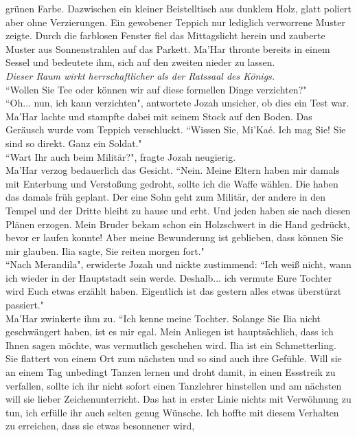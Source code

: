 grünen Farbe. Dazwischen ein kleiner Beistelltisch aus dunklem Holz, glatt poliert aber ohne 
Verzierungen. Ein gewobener Teppich nur lediglich verworrene Muster zeigte. Durch die farblosen 
Fenster fiel das Mittagslicht herein und zauberte Muster aus Sonnenstrahlen auf das Parkett. Ma'Har 
thronte bereits in einem Sessel und bedeutete ihm, sich auf den zweiten nieder zu lassen.\\
\textit{Dieser Raum wirkt herrschaftlicher als der Ratssaal des Königs.}\\
 ``Wollen Sie Tee oder können wir auf diese formellen Dinge verzichten?"\\
 ``Oh... nun, ich kann verzichten", antwortete Jozah unsicher, ob dies ein Test war.\\
Ma'Har lachte und stampfte dabei mit seinem Stock auf den Boden. Das Geräusch wurde vom Teppich 
verschluckt.  ``Wissen Sie, Mi'Kaé. Ich mag Sie! Sie sind so direkt. Ganz ein Soldat."\\
 ``Wart Ihr auch beim Militär?", fragte Jozah neugierig.\\
Ma'Har verzog bedauerlich das Gesicht.  ``Nein. Meine Eltern haben mir damals mit Enterbung und 
Verstoßung gedroht, sollte ich die Waffe wählen. Die haben das damals früh geplant. Der eine Sohn 
geht zum Militär, der andere in den Tempel und der Dritte bleibt zu hause und erbt. Und jeden haben 
sie nach diesen Plänen erzogen. Mein Bruder bekam schon ein Holzschwert in die Hand 
gedrückt, bevor er laufen konnte! Aber meine Bewunderung ist geblieben, dass können Sie mir 
glauben. Ilia sagte, Sie reiten morgen fort."\\
 ``Nach Merandila", erwiderte Jozah und nickte zustimmend:  ``Ich weiß nicht, wann ich wieder in 
der Hauptstadt sein werde. Deshalb... ich vermute Eure Tochter wird Euch etwas erzählt haben. 
Eigentlich ist das gestern alles etwas überstürzt passiert."\\
Ma'Har zwinkerte ihm zu.  ``Ich kenne meine Tochter. Solange Sie Ilia nicht geschwängert haben, ist 
es mir egal. Mein Anliegen ist hauptsächlich, dass ich Ihnen sagen möchte, was vermutlich geschehen 
wird. Ilia ist ein Schmetterling. Sie flattert von einem Ort zum nächsten und so sind auch ihre 
Gefühle. Will sie an einem Tag unbedingt Tanzen lernen und droht damit, in einen Essstreik zu 
verfallen, sollte ich ihr nicht sofort einen Tanzlehrer hinstellen und am nächsten will sie lieber 
Zeichenunterricht. Das hat in erster Linie nichts mit Verwöhnung zu tun, ich erfülle ihr auch 
selten genug Wünsche. Ich hoffte mit diesem Verhalten zu erreichen, dass sie etwas besonnener wird, 
